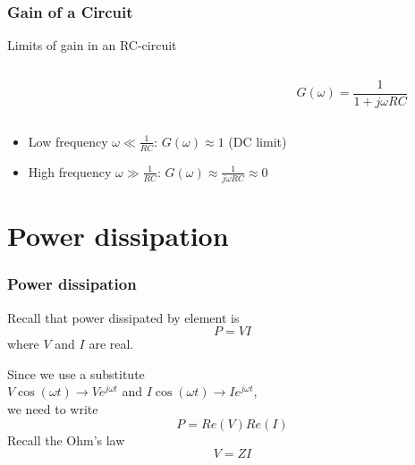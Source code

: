 \documentclass[beamer]{standalone}
\begin{document}
\begin{frame}
 \frametitle{Gain of a Circuit}
 \begin{block}{Limits of gain in an RC-circuit}
  \begin{columns}
   \begin{column}{0.0\textwidth}
   \end{column}
   \begin{column}{0.5\textwidth}
   \end{column}
   \begin{column}{0.5\textwidth}
    \begin{equation*}
     G(\omega) = \frac{1}{1 + j\omega R C}
    \end{equation*}
   \end{column}
  \end{columns}
  \begin{itemize}
   \item Low frequency $\omega \ll \frac{1}{RC}$: $G(\omega) \approx 1$ (DC limit)
   \item High frequency $\omega \gg \frac{1}{RC}$: $G(\omega) \approx \frac{1}{j\omega R C} \approx 0$
  \end{itemize}
 \end{block}
\end{frame}

\section{Power dissipation}
\begin{frame}
\frametitle{Power dissipation}
	Recall that power dissipated by element is
	\[P=V I\] where $V$ and $I$ are real.

	Since we use a  substitute \\
	$V\cos(\omega t) \to V e^{j \omega t}$ 
	and  $I\cos(\omega t) \to I e^{j \omega t}$,  \\
	we need to write
	\alert{
	\[P=Re(V) Re(I)\]
	}
	Recall the Ohm's law
	\[ V=Z I\]
\end{frame}
\end{document}
